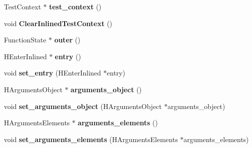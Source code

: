 \begin{DoxyCompactItemize}
\item 
\hypertarget{classv8_1_1internal_1_1_v8___f_i_n_a_l_a7392267846a3e124ce67f1cd20301904}{}Test\+Context $\ast$ {\bfseries test\+\_\+context} ()\label{classv8_1_1internal_1_1_v8___f_i_n_a_l_a7392267846a3e124ce67f1cd20301904}

\item 
\hypertarget{classv8_1_1internal_1_1_v8___f_i_n_a_l_ad4d134b24233e014913f86dff375bea6}{}void {\bfseries Clear\+Inlined\+Test\+Context} ()\label{classv8_1_1internal_1_1_v8___f_i_n_a_l_ad4d134b24233e014913f86dff375bea6}

\item 
\hypertarget{classv8_1_1internal_1_1_v8___f_i_n_a_l_a8ee6727390e1d5d1506503925b48b9a7}{}Function\+State $\ast$ {\bfseries outer} ()\label{classv8_1_1internal_1_1_v8___f_i_n_a_l_a8ee6727390e1d5d1506503925b48b9a7}

\item 
\hypertarget{classv8_1_1internal_1_1_v8___f_i_n_a_l_aad097bde730a5b7a5298d9b23f0dafce}{}H\+Enter\+Inlined $\ast$ {\bfseries entry} ()\label{classv8_1_1internal_1_1_v8___f_i_n_a_l_aad097bde730a5b7a5298d9b23f0dafce}

\item 
\hypertarget{classv8_1_1internal_1_1_v8___f_i_n_a_l_a1b276b07163e52dad2b44d438a4b86c6}{}void {\bfseries set\+\_\+entry} (H\+Enter\+Inlined $\ast$entry)\label{classv8_1_1internal_1_1_v8___f_i_n_a_l_a1b276b07163e52dad2b44d438a4b86c6}

\item 
\hypertarget{classv8_1_1internal_1_1_v8___f_i_n_a_l_a2e3b9166df20ef2936781f5834abaab0}{}H\+Arguments\+Object $\ast$ {\bfseries arguments\+\_\+object} ()\label{classv8_1_1internal_1_1_v8___f_i_n_a_l_a2e3b9166df20ef2936781f5834abaab0}

\item 
\hypertarget{classv8_1_1internal_1_1_v8___f_i_n_a_l_ae0e960191e8d68813d18a135b1da853d}{}void {\bfseries set\+\_\+arguments\+\_\+object} (H\+Arguments\+Object $\ast$arguments\+\_\+object)\label{classv8_1_1internal_1_1_v8___f_i_n_a_l_ae0e960191e8d68813d18a135b1da853d}

\item 
\hypertarget{classv8_1_1internal_1_1_v8___f_i_n_a_l_a3c2972c893a3cdd728d74859a6dc0cdb}{}H\+Arguments\+Elements $\ast$ {\bfseries arguments\+\_\+elements} ()\label{classv8_1_1internal_1_1_v8___f_i_n_a_l_a3c2972c893a3cdd728d74859a6dc0cdb}

\item 
\hypertarget{classv8_1_1internal_1_1_v8___f_i_n_a_l_a11cc70cdda60b2a978186759d258d9ce}{}void {\bfseries set\+\_\+arguments\+\_\+elements} (H\+Arguments\+Elements $\ast$arguments\+\_\+elements)\label{classv8_1_1internal_1_1_v8___f_i_n_a_l_a11cc70cdda60b2a978186759d258d9ce}


\end{DoxyCompactItemize}
